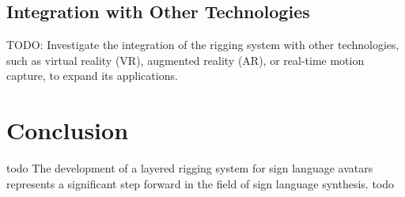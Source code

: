 \documentclass[../../main.tex]{subfiles}
\begin{document}
\subsection{Integration with Other Technologies}
TODO: Investigate the integration of the rigging system with other technologies, such as virtual reality (VR), augmented reality (AR), or real-time motion capture, to expand its applications.

\section{Conclusion}
todo The development of a layered rigging system for sign language avatars represents a significant step forward in the field of sign language synthesis. todo
\end{document}
